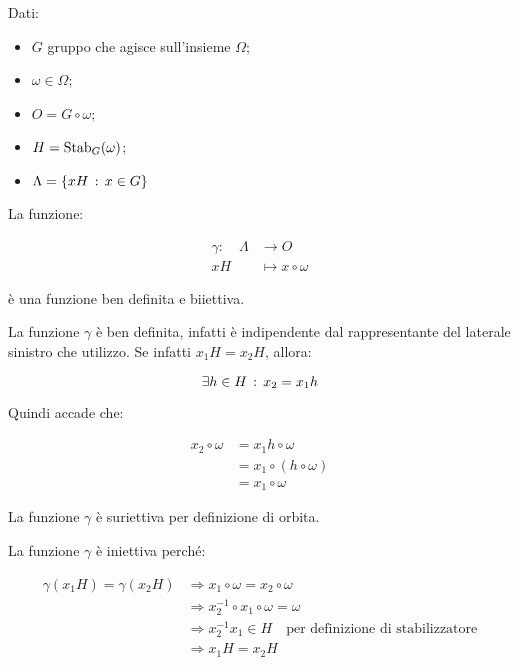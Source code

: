 \begin{teorema}
	Dati:
	
	\begin{itemize}
		\item $G$ gruppo che agisce sull'insieme $\Omega$;
		\item $\omega \in \Omega$;
		\item $O = G \circ \omega$;
		\item $H = \operatorname{Stab}_G(\omega)$;
		\item $\Lambda = \{xH \,:\, x \in G\}$
	\end{itemize}

	La funzione:
	
	\begin{align}
		\gamma :\quad \Lambda &\longrightarrow O \\
		xH &\longmapsto x \circ \omega
	\end{align}

	è una funzione ben definita e biiettiva.
\end{teorema}
\begin{dimostrazione}
	La funzione $\gamma$ è ben definita, infatti è indipendente dal rappresentante del laterale sinistro che utilizzo. Se infatti $x_1H = x_2H$, allora:
	
	\begin{equation}
		\exists h \in H \,:\, x_2 = x_1 h
	\end{equation}
	
	Quindi accade che:
	
	\begin{align}
		x_2 \circ \omega &= x_1 h \circ \omega \\
		&= x_1 \circ (h \circ \omega) \\
		&= x_1 \circ \omega
	\end{align}

	La funzione $\gamma$ è suriettiva per definizione di orbita. 
	
	La funzione $\gamma$ è iniettiva perché:
	
	\begin{align}
		\gamma(x_1H) = \gamma(x_2H) 
		&\Longrightarrow x_1 \circ \omega = x_2 \circ \omega \\
		&\Longrightarrow x_2^{-1} \circ x_1 \circ \omega = \omega \\
		&\Longrightarrow x_2^{-1} x_1 \in H \quad \text{per definizione di stabilizzatore} \\
		&\Longrightarrow x_1H = x_2H
	\end{align}
\end{dimostrazione}


